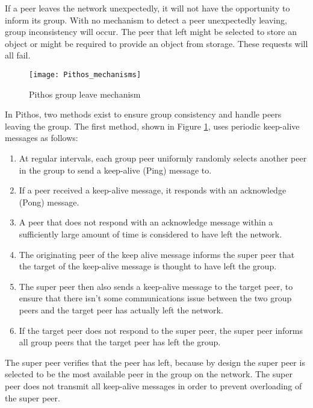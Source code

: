 If a peer leaves the network unexpectedly, it will not have the opportunity to inform its group. With no mechanism to detect a peer unexpectedly leaving, group inconsistency will occur. The peer that left might be selected to store an object or might be required to provide an object from storage. These requests will all fail.

\begin{figure}[htbp]
 \centering
 \texttt{[image: Pithos\_mechanisms]}
 \caption{Pithos group leave mechanism}
 \label{fig_pithos_leave}
\end{figure}

In Pithos, two methods exist to ensure group consistency and handle peers leaving the group. The first method, shown in Figure \ref{fig_pithos_leave}, uses periodic keep-alive messages as follows:
%
\begin{enumerate}
\item At regular intervals, each group peer uniformly randomly selects another peer in the group to send a keep-alive (Ping) message to.

\item If a peer received a keep-alive message, it responds with an acknowledge (Pong) message.

\item A peer that does not respond with an acknowledge message within a sufficiently large amount of time is considered to have left the network.

\item The originating peer of the keep alive message informs the super peer that the target of the keep-alive message is thought to have left the group.

\item The super peer then also sends a keep-alive message to the target peer, to ensure that there isn't some communications issue between the two group peers and the target peer has actually left the network.

\item If the target peer does not respond to the super peer, the super peer informs all group peers that the target peer has left the group.
\end{enumerate}

The super peer verifies that the peer has left, because by design the super peer is selected to be the most available peer in the group on the network. The super peer does not transmit all keep-alive messages in order to prevent overloading of the super peer.

